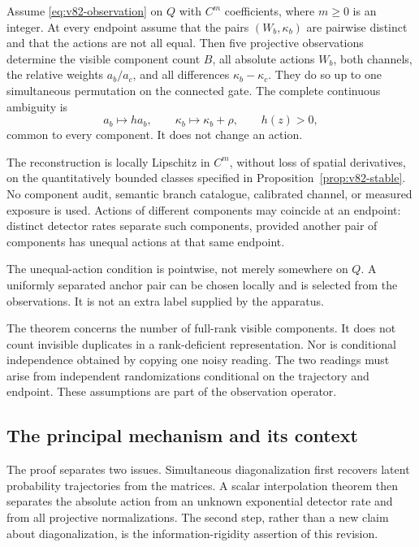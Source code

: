 \begin{theorem}
\label{thm:v82-main}
Assume \eqref{eq:v82-observation} on $Q$ with $C^m$ coefficients,
where $m\ge0$ is an integer. At every endpoint assume that the pairs
$(W_b,\kappa_b)$ are pairwise distinct and that the actions are not
all equal. Then five projective observations determine the visible
component count $B$, all absolute actions $W_b$, both channels, the
relative weights $a_b/a_c$, and all differences $\kappa_b-\kappa_c$.
They do so up to one simultaneous permutation on the connected gate.
The complete continuous ambiguity is
\begin{equation}\label{eq:v82-gauge}
 a_b\longmapsto h a_b,\qquad
 \kappa_b\longmapsto\kappa_b+\rho,
 \qquad h(z)>0,
\end{equation}
common to every component. It does not change an action.

The reconstruction is locally Lipschitz in $C^m$, without loss of
spatial derivatives, on the quantitatively bounded classes specified
in Proposition~\ref{prop:v82-stable}. No component audit, semantic
branch catalogue, calibrated channel, or measured exposure is used.
Actions of different components may coincide at an endpoint: distinct
detector rates separate such components, provided another pair of components has unequal actions at that same
endpoint.
\end{theorem}

The unequal-action condition is pointwise, not merely somewhere on $Q$.
A uniformly separated anchor pair can be chosen locally and is selected
from the observations. It is not an extra label supplied by the apparatus.

The theorem concerns the number of full-rank visible components. It
does not count invisible duplicates in a rank-deficient representation.
Nor is conditional independence obtained by copying one noisy reading.
The two readings must arise from independent randomizations conditional
on the trajectory and endpoint. These assumptions are part of the
observation operator.

\subsection{The principal mechanism and its context}

The proof separates two issues. Simultaneous diagonalization first
recovers latent probability trajectories from the matrices. A scalar
interpolation theorem then separates the absolute action from an unknown
exponential detector rate and from all projective normalizations.
The second step, rather than a new claim about diagonalization, is the
information-rigidity assertion of this revision.

